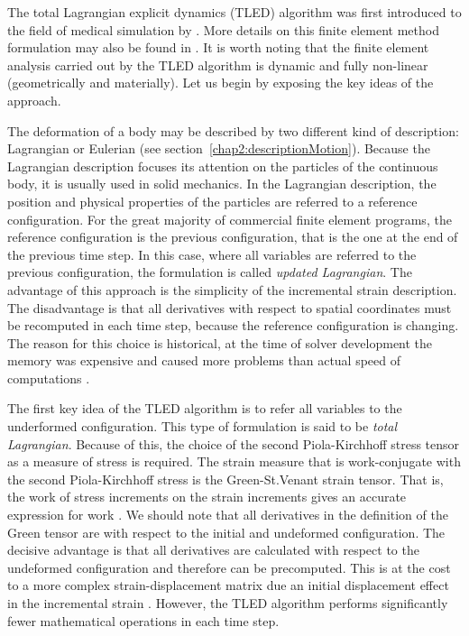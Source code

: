 The total Lagrangian explicit dynamics (TLED) algorithm was first introduced to the field of medical simulation by \cite{Miller07}. More details on this finite element method formulation may also be found in \cite{Bathe95}. It is worth noting that the finite element analysis carried out by the TLED algorithm is dynamic and fully non-linear (geometrically and materially). Let us begin by exposing the key ideas of the approach. 

The deformation of a body may be described by two different kind of description: Lagrangian or Eulerian (see section~\ref{chap2:descriptionMotion}). Because the Lagrangian description focuses its attention on the particles of the continuous body, it is usually used in solid mechanics. In the Lagrangian description, the position and physical properties of the particles are referred to a reference configuration. For the great majority of commercial finite element programs, the reference configuration is the previous configuration, that is the one at the end of the previous time step. In this case, where all variables are referred to the previous configuration, the formulation is called \emph{updated Lagrangian}. The advantage of this approach is the simplicity of the incremental strain description. The disadvantage is that all derivatives with respect to spatial coordinates must be recomputed in each time step, because the reference configuration is changing. The reason for this choice is historical, at the time of solver development the memory was expensive and caused more problems than actual speed of computations \citep{Miller07}. 

The first key idea of the TLED algorithm is to refer all variables to the underformed configuration. This type of formulation is said to be \emph{total Lagrangian}. Because of this, the choice of the second Piola-Kirchhoff stress tensor as a measure of stress is required. The strain measure that is work-conjugate with the second Piola-Kirchhoff stress is the Green-St.Venant strain tensor. That is,  the work of stress increments on the strain increments gives an accurate expression for work \citep{Ji10}. We should note that all derivatives in the definition of the Green tensor are with respect to the initial and undeformed configuration. The decisive advantage is that all derivatives are calculated with respect to the undeformed configuration and therefore can be precomputed. This is at the cost to a more complex strain-displacement matrix due an initial displacement effect in the incremental strain \citep{Bathe95}. However, the TLED algorithm performs significantly fewer mathematical operations in each time step. 

